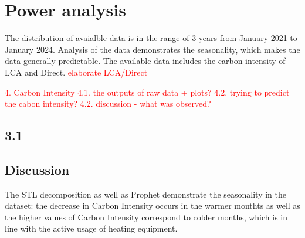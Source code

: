 \section{Power analysis}
\noindent

The distribution of avaialble data is in the range of 3 years from January 2021 to January 2024. Analysis of the data demonstrates the seasonality, which makes the data generally predictable. The available data includes the carbon intensity of LCA and Direct. \textcolor{red}{elaborate LCA/Direct}

\textcolor{red}{4. Carbon Intensity 
4.1. the outputs of raw data + plots?
4.2. trying to predict the cabon intensity?
4.2. discussion - what was observed?}

\subsection{3.1}

\subsection{Discussion}

The STL decomposition as well as Prophet demonstrate the seasonality in the dataset: the decrease in Carbon Intensity occurs in the warmer monthts as well as the higher values of Carbon Intensity correspond to colder months, which is in line with the active usage of heating equipment.  